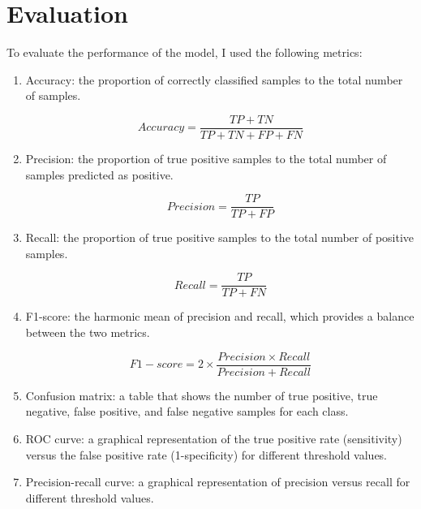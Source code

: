 \documentclass[14pt]{extreport}
\begin{document}
\chapter{Evaluation}
To evaluate the performance of the model, I used the following metrics:
\begin{enumerate}
    \item[\textbullet] Accuracy: the proportion of correctly classified samples to the total number of samples.

          \[Accuracy = \frac{TP + TN}{TP + TN + FP + FN}\]

    \item[\textbullet] Precision: the proportion of true positive samples to the total number of samples predicted as positive.

          \[Precision = \frac{TP}{TP + FP}\]

    \item[\textbullet] Recall: the proportion of true positive samples to the total number of positive samples.

          \[Recall = \frac{TP}{TP + FN}\]

    \item[\textbullet] F1-score: the harmonic mean of precision and recall, which provides a balance between the two metrics.

          \[F1-score = 2 \times \frac{Precision \times Recall}{Precision + Recall}\]

    \item[\textbullet] Confusion matrix: a table that shows the number of true positive, true negative, false positive, and false negative samples for each class.

    \item[\textbullet] ROC curve: a graphical representation of the true positive rate (sensitivity) versus the false positive rate (1-specificity) for different threshold values.

    \item[\textbullet] Precision-recall curve: a graphical representation of precision versus recall for different threshold values.
\end{enumerate}
\end{document}
